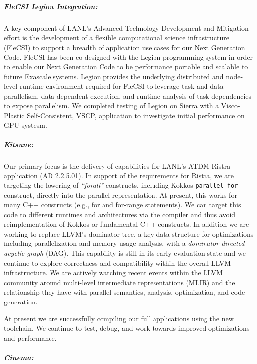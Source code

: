 \subparagraph{FleCSI Legion Integration:} 
A key component of LANL's Advanced Technology  Development and Mitigation effort is the development of a flexible computational science infrastructure (FleCSI) to support a breadth of application use cases for our Next Generation Code. FleCSI has been co-designed with the Legion programming system in order to enable our Next Generation Code to be performance portable and scalable to future Exascale systems. Legion provides the underlying distributed and node-level runtime environment required for FleCSI to leverage task and data parallelism, data dependent execution, and runtime analysis of task dependencies to expose parallelism. We completed testing of Legion on Sierra with a Visco-Plastic Self-Consistent, VSCP, application to investigate initial performance on GPU systesm.

\subparagraph{Kitsune:}
Our primary focus is the delivery of capabilities for LANL's ATDM
Ristra application (AD 2.2.5.01).  In support of the requirements for
Ristra, we are targeting the lowering of \textit{``forall''} constructs,
including Kokkos \texttt{parallel\_for} construct, directly into the
parallel representation.  At present, this works for many C++ constructs
(e.g., for and for-range statements).  We can target this code to different
runtimes and architectures via the compiler and thus avoid reimplementation
of Kokkos or fundamental C++ constructs. In addition we are working to replace
LLVM's dominator tree, a key data structure for optimizations including
parallelization and memory usage analysis, with a \emph{dominator directed-acyclic-graph}
(DAG).  This capability is still in its early evaluation state and we continue to
explore correctness and compatibility within the overall LLVM infrastructure. We are
actively watching recent events within the LLVM community around
multi-level intermediate representations (MLIR) and the relationship
they have with parallel semantics, analysis, optimization, and code
generation.

At present we are successfully compiling our full applications using the new
toolchain.  We continue to test, debug, and work towards improved optimizations
and performance. 

\subparagraph{Cinema:}

